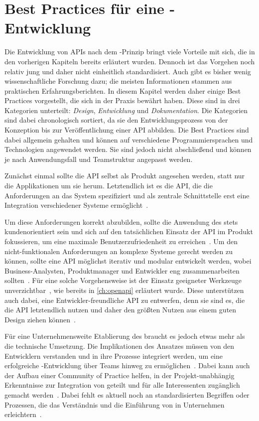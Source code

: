 \chapter{Best Practices für eine \AF-Entwicklung}
Die Entwicklung von \acp{API} nach dem \AF-Prinzip bringt viele Vorteile mit sich, die in den vorherigen Kapiteln bereits erläutert wurden.
Dennoch ist das Vorgehen noch relativ jung und daher nicht einheitlich standardisiert.
Auch gibt es bisher wenig wissenschaftliche Forschung dazu; die meisten Informationen stammen aus praktischen Erfahrungsberichten.
In diesem Kapitel werden daher einige Best Practices vorgestellt, die sich in der Praxis bewährt haben.
Diese sind in drei Kategorien unterteilt: \emph{Design}, \emph{Entwicklung} und \emph{Dokumentation}.
Die Kategorien sind dabei chronologisch sortiert, da sie den Entwicklungsprozess von der Konzeption bis zur Veröffentlichung einer \ac{API} abbilden.
Die Best Practices sind dabei allgemein gehalten und können auf verschiedene Programmiersprachen und Technologien angewendet werden.
Sie sind jedoch nicht abschließend und können je nach Anwendungsfall und Teamstruktur angepasst werden.

Zunächst einmal sollte die \ac{API} selbst als Produkt angesehen werden, statt nur die Applikationen um sie herum.
Letztendlich ist es die \ac{API}, die die Anforderungen an das System spezifiziert und als zentrale Schnittstelle erst eine Integration verschiedener Systeme ermöglicht~\cite[350]{de23}.

Um diese Anforderungen korrekt abzubilden, sollte die Anwendung des \AFAes stets kundenorientiert sein und sich auf den tatsächlichen Einsatz der \ac{API} im Produkt fokussieren, um eine maximale Benutzerzufriedenheit zu erreichen~\cite[1627]{cha21}.
Um den nicht-funktionalen Anforderungen an komplexe Systeme gerecht werden zu können, sollte eine \ac{API} möglichst iterativ und modular entwickelt werden, wobei Business-Analysten, Produktmanager und Entwickler eng zusammenarbeiten sollten~\cite[352]{de23}.
Für eine solche Vorgehensweise ist der Einsatz geeigneter Werkzeuge unverzichtbar~\cite[1628]{cha21}, wie bereits in \autoref{ch:openapi} erläutert wurde.
Diese unterstützen auch dabei, eine Entwickler-freundliche \ac{API} zu entwerfen, denn sie sind es, die die \ac{API} letztendlich nutzen und daher den größten Nutzen aus einem guten Design ziehen können~\cite[355]{de23}.

Für eine Unternehmensweite Etablierung des \AFAes braucht es jedoch etwas mehr als die technische Umsetzung.
Die Implikationen des Ansatzes müssen von den Entwicklern verstanden und in ihre Prozesse integriert werden, um eine erfolgreiche \AF-Entwicklung über Teams hinweg zu ermöglichen~\cite[359]{de23}.
Dabei kann auch der Aufbau einer Community of Practice helfen, in der Projekt-unabhängig Erkenntnisse zur Integration von \AF geteilt und für alle Interessenten zugänglich gemacht werden~\cite[4]{kul23}.
Dabei fehlt es aktuell noch an standardisierten Begriffen oder Prozessen, die das Verständnis und die Einführung von \AF in Unternehmen erleichtern~\cites[77]{bea22}[2]{kul23}.

